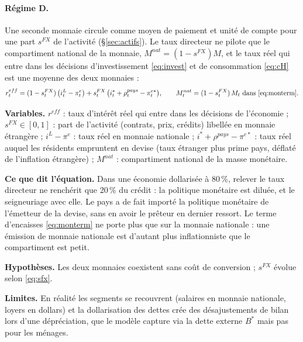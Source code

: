 \documentclass[11pt,a4paper]{article}
\newcommand{\variables}{\par\noindent\textbf{Variables.} }
\newcommand{\sens}{\par\noindent\textbf{Ce que dit l'équation.} }
\newcommand{\hyp}{\par\noindent\textbf{Hypothèses.} }
\newcommand{\limites}{\par\noindent\textbf{Limites.} }
\begin{document}
\paragraph{Régime D.} Une seconde monnaie circule comme moyen de paiement et unité de compte pour une part $s^{FX}$ de l'activité (\S\ref{sec:actifs}). Le taux directeur ne pilote que le compartiment national de la monnaie, $M^{nat}=(1-s^{FX})M$, et le taux réel qui entre dans les décisions d'investissement \eqref{eq:invest} et de consommation \eqref{eq:cH} est une moyenne des deux monnaies :
\begin{equation}
r^{eff}_t = (1-s^{FX}_t)\,\big(i^L_t - \pi^e_t\big) + s^{FX}_t\,\big(i^\ast_t + \rho^{pays}_t - \pi^{e\ast}_t\big), \qquad M^{nat}_t = (1-s^{FX}_t)\,M_t \ \text{dans \eqref{eq:monterm}}.
\label{eq:reff}
\end{equation}
\begin{lecture}
\variables $r^{eff}$ : taux d'intérêt réel qui entre dans les décisions de l'économie ; $s^{FX}\in[0,1]$ : part de l'activité (contrats, prix, crédits) libellée en monnaie étrangère ; $i^L-\pi^e$ : taux réel en monnaie nationale ; $i^\ast+\rho^{pays}-\pi^{e\ast}$ : taux réel auquel les résidents empruntent en devise (taux étranger plus prime pays, déflaté de l'inflation étrangère) ; $M^{nat}$ : compartiment national de la masse monétaire.
\sens Dans une économie dollarisée à 80\,\%, relever le taux directeur ne renchérit que 20\,\% du crédit : la politique monétaire est diluée, et le seigneuriage avec elle. Le pays a de fait importé la politique monétaire de l'émetteur de la devise, sans en avoir le prêteur en dernier ressort. Le terme d'encaisses \eqref{eq:monterm} ne porte plus que sur la monnaie nationale : une émission de monnaie nationale est d'autant plus inflationniste que le compartiment est petit.
\hyp Les deux monnaies coexistent sans coût de conversion ; $s^{FX}$ évolue selon \eqref{eq:sfx}.
\limites En réalité les segments se recouvrent (salaires en monnaie nationale, loyers en dollars) et la dollarisation des dettes crée des désajustements de bilan lors d'une dépréciation, que le modèle capture via la dette externe $B^\ast$ mais pas pour les ménages.
\end{lecture}
\end{document}
